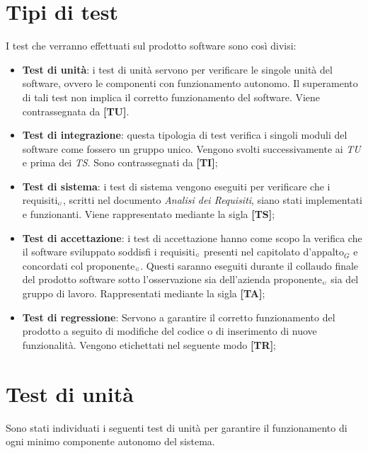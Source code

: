 \section{Tipi di test} \label{SpecificaDeiTestTipiDiTest}
I test che verranno effettuati sul prodotto software sono così divisi:
\begin{itemize}
	\item \textbf{Test di unità}: i test di unità servono per verificare le singole unità del software, ovvero le componenti con funzionamento autonomo.
	Il superamento di tali test non implica il corretto funzionamento del software.
	Viene contrassegnata da \textbf{[TU]}.
	
	\item \textbf{Test di integrazione}: questa tipologia di test verifica i singoli moduli del software come fossero un gruppo unico.
	Vengono svolti successivamente ai \textit{TU} e prima dei \textit{TS}.
	Sono contrassegnati da \textbf{[TI]};
	
	\item \textbf{Test di sistema}: i test di sistema vengono eseguiti per verificare che i requisiti$_{\scaleto{G}{3pt}}$, scritti nel documento \textit{Analisi dei Requisiti}, siano stati implementati e funzionanti.
	Viene rappresentato mediante la sigla \textbf{[TS]};
	
	\item \textbf{Test di accettazione}: i test di accettazione hanno come scopo la verifica che il software sviluppato soddisfi i requisiti$_{\scaleto{G}{3pt}}$ presenti nel capitolato d’appalto$_G$ e concordati col proponente$_{\scaleto{G}{3pt}}$.
	Questi saranno eseguiti durante il collaudo finale del prodotto software sotto l'osservazione sia dell'azienda proponente$_{\scaleto{G}{3pt}}$ sia del gruppo di lavoro.
	Rappresentati mediante la sigla \textbf{[TA]};

	\item \textbf{Test di regressione}: Servono a garantire il corretto funzionamento del prodotto a seguito di modifiche del codice o di inserimento di nuove funzionalità.
	Vengono etichettati nel seguente modo \textbf{[TR]};

\end{itemize}

\clearpage
\section{Test di unità}\label{SpecificaDeiTestTestDiUnita}
Sono stati individuati i seguenti test di unità per garantire il funzionamento di ogni minimo componente autonomo del sistema.

